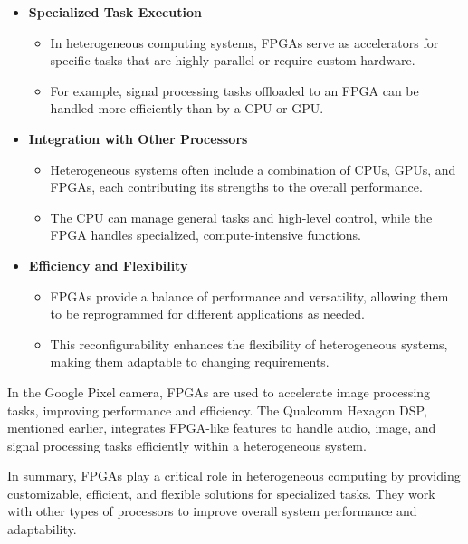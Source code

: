 \begin{itemize}
    \item \textbf{Specialized Task Execution}
    \begin{itemize}
        \item In heterogeneous computing systems, FPGAs serve as accelerators for specific tasks that are highly parallel or require custom hardware.
        \item For example, signal processing tasks offloaded to an FPGA can be handled more efficiently than by a CPU or GPU.
    \end{itemize}

    \item \textbf{Integration with Other Processors}
    \begin{itemize}
        \item Heterogeneous systems often include a combination of CPUs, GPUs, and FPGAs, each contributing its strengths to the overall performance.
        \item The CPU can manage general tasks and high-level control, while the FPGA handles specialized, compute-intensive functions.
    \end{itemize}

    \item \textbf{Efficiency and Flexibility}
    \begin{itemize}
        \item FPGAs provide a balance of performance and versatility, allowing them to be reprogrammed for different applications as needed.
        \item This reconfigurability enhances the flexibility of heterogeneous systems, making them adaptable to changing requirements.
    \end{itemize}
\end{itemize}
In the Google Pixel camera, FPGAs are used to accelerate image processing tasks, improving performance and efficiency. The Qualcomm Hexagon DSP, mentioned earlier, integrates FPGA-like features to handle audio, image, and signal processing tasks efficiently within a heterogeneous system.

\highspace
In summary, FPGAs play a critical role in heterogeneous computing by providing customizable, efficient, and flexible solutions for specialized tasks. They work with other types of processors to improve overall system performance and adaptability.

\newpage

